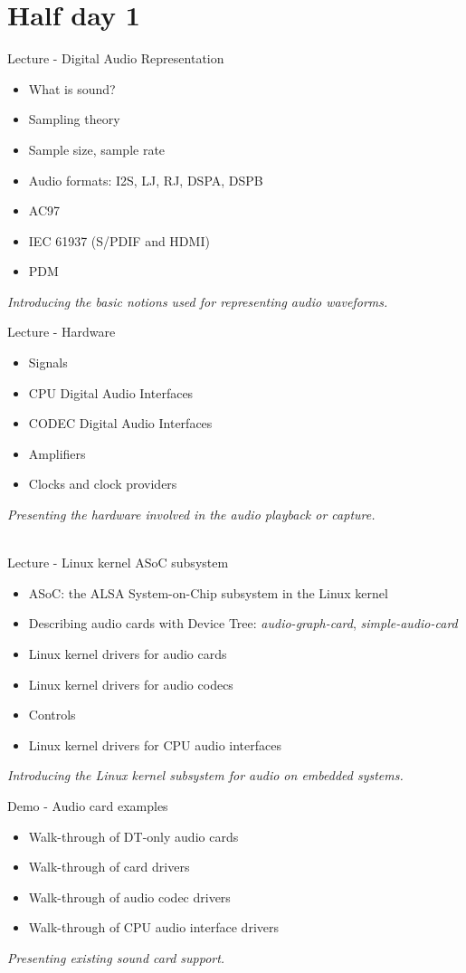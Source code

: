 \documentclass[a4paper,12pt,obeyspaces,spaces,hyphens]{article}
\begin{document}
\feshowtitle

\feshowinfo

\section{Half day 1}

\feagendatwocolumn
{Lecture - Digital Audio Representation}
{
  \begin{itemize}
  \item What is sound?
  \item Sampling theory
  \item Sample size, sample rate
  \item Audio formats: I2S, LJ, RJ, DSPA, DSPB
  \item AC97
  \item IEC 61937 (S/PDIF and HDMI)
  \item PDM
  \end{itemize}
  \vspace{0.5em}
  {\em Introducing the basic notions used for representing audio waveforms.}
}
{Lecture - Hardware}
{
  \begin{itemize}
  \item Signals
  \item CPU Digital Audio Interfaces
  \item CODEC Digital Audio Interfaces
  \item Amplifiers
  \item Clocks and clock providers
  \end{itemize}
  \vspace{0.5em}
  {\em Presenting the hardware involved in the audio playback or capture.}
}
\\
\feagendatwocolumn
{Lecture - Linux kernel ASoC subsystem}
{
  \begin{itemize}
  \item ASoC: the ALSA System-on-Chip subsystem in the Linux kernel
  \item Describing audio cards with Device Tree: {\em
      audio-graph-card}, {\em simple-audio-card}
  \item Linux kernel drivers for audio cards
  \item Linux kernel drivers for audio codecs
  \item Controls
  \item Linux kernel drivers for CPU audio interfaces
  \end{itemize}
  \vspace{0.5em}
  {\em Introducing the Linux kernel subsystem for audio on embedded systems.}
}
{Demo - Audio card examples}
{
  \begin{itemize}
  \item Walk-through of DT-only audio cards
  \item Walk-through of card drivers
  \item Walk-through of audio codec drivers
  \item Walk-through of CPU audio interface drivers
  \end{itemize}
  \vspace{0.5em}
  {\em Presenting existing sound card support.}
}
\end{document}
